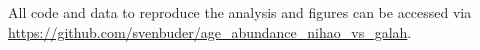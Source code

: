 \documentclass[fleqn,usenatbib]{mnras}
\begin{document}
All code and data to reproduce the analysis and figures can be accessed via \url{https://github.com/svenbuder/age_abundance_nihao_vs_galah}.









\bsp	%
\label{lastpage}
\end{document}
